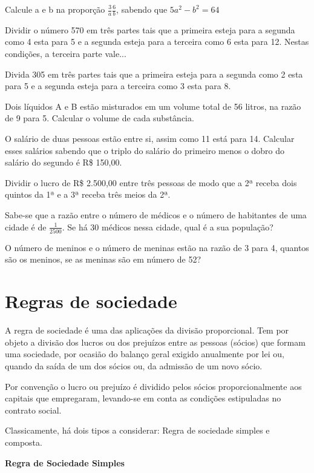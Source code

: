 \begin{exercicios}
	\exitem{} Calcule a e b na proporção $\frac{3}{a}\frac{6}{b}$, sabendo que $5a^2-b^2=64$

	\exitem{} Dividir o número 570 em três partes tais que a primeira esteja para a segunda como 4 esta para 5 e a segunda esteja para a terceira como 6 esta para 12. Nestas condições, a terceira parte vale...

	\exitem{} Divida 305 em três partes tais que a primeira esteja para a segunda como 2 esta para 5 e a segunda esteja para a terceira como 3 esta para 8. 

	\exitem{}  Dois líquidos A e B estão misturados em um volume total de 56 litros, na razão de 9 para 5. Calcular o volume de cada substância. 

	\exitem{} O salário de duas pessoas estão entre si, assim como 11 está para 14. Calcular esses salários sabendo que o triplo do salário do primeiro menos o dobro do salário do segundo é R\$  150,00. 

	\exitem{}  Dividir o lucro de R\$ 2.500,00 entre três pessoas de modo que a 2ª receba dois quintos da 1ª e a 3ª receba três meios da 2ª.

	\exitem{}  Sabe-se que a razão entre o número de médicos e o número de habitantes de uma cidade é de $\frac{1}{2500}$. Se há 30 médicos nessa cidade, qual é a sua população?

	\exitem O número de meninos e o número de meninas estão na razão de 3 para 4, quantos são os meninos, se as meninas são em número de 52?

\end{exercicios}

\section{Regras de sociedade }

\quad A regra de sociedade é uma das aplicações da divisão proporcional. Tem por objeto a divisão dos lucros ou dos prejuízos entre as pessoas (sócios) que formam uma sociedade, por ocasião do balanço geral exigido anualmente por lei ou, quando da saída de um dos sócios ou, da admissão de um novo sócio. 

\quad Por convenção o lucro ou prejuízo é dividido pelos sócios proporcionalmente aos capitais que empregaram, levando-se em conta as condições estipuladas no contrato social.

\quad Classicamente, há dois tipos a considerar: Regra de sociedade simples e composta.

\quad \textbf{Regra de Sociedade Simples }

